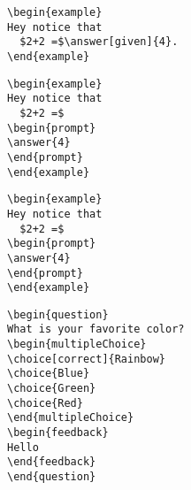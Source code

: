 \documentclass{article}
\begin{document}
\begin{verbatim}
\begin{example}
Hey notice that
  $2+2 =$\answer[given]{4}.
\end{example}
\end{verbatim}

\begin{verbatim}
\begin{example}
Hey notice that
  $2+2 =$
\begin{prompt}
\answer{4}
\end{prompt}
\end{example}
\end{verbatim}

\begin{verbatim}
\begin{example}
Hey notice that
  $2+2 =$
\begin{prompt}
\answer{4}
\end{prompt}
\end{example}
\end{verbatim}

\begin{verbatim}
\begin{question}
What is your favorite color?
\begin{multipleChoice}
\choice[correct]{Rainbow}
\choice{Blue}
\choice{Green}
\choice{Red}
\end{multipleChoice}
\begin{feedback}
Hello
\end{feedback}
\end{question}
\end{verbatim}



\end{document}
